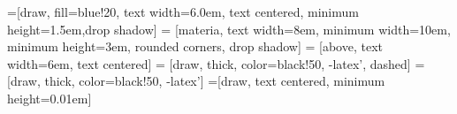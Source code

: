 \usepackage{ifthen}
\usepackage[ruled,vlined,linesnumbered]{algorithm2e}

\newcommand{\y}{\ensuremath{\boldsymbol y}}
\newcommand{\Labels}{\ensuremath{\vec{L}}}
\newcommand{\CUT}{\ensuremath{\text{CUT}}}
\newcommand{\w}{\ensuremath{w}}
\newcommand{\MC}{\ensuremath{\text{MC}}}
\newcommand{\CC}{\ensuremath{\text{CC}}}
\newcommand{\ol}[1]{\overline{#1}}
\newcommand{\ExpAndExplore}{Expand \& Explore}

\renewcommand{\vec}[1]{\mathbf{#1}}


\DeclareMathOperator*{\argmin}{\arg\!\min}


\usepackage{todonotes}

\usepackage{verbatim}
\usepackage{tikz,times}
\usetikzlibrary{shapes,arrows,chains,mindmap,backgrounds,positioning,calc}


\usepackage{amsmath,bm,times}
\newcommand{\mx}[1]{\mathbf{\bm{#1}}} %
\newcommand{\vc}[1]{\mathbf{\bm{#1}}} %

\usepackage{geometry}


\usetikzlibrary{shadows,arrows}

=[draw, fill=blue!20, text width=6.0em, text centered,
  minimum height=1.5em,drop shadow]
 = [materia, text width=8em, minimum width=10em,
  minimum height=3em, rounded corners, drop shadow]
 = [above, text width=6em, text centered]
 = [draw, thick, color=black!50, -latex', dashed]
 = [draw, thick, color=black!50, -latex']
=[draw, text centered, minimum height=0.01em]
 
\newcommand{\blockdist}{1.3}
\newcommand{\edgedist}{1.5}

\newcommand{\practica}[2]{node (p#1) [practica]
  {Pr\'actica #1\\{\scriptsize\textit{#2}}}}

\newcommand{\background}[5]{%
  \begin{pgfonlayer}{background}
    \path (#1.west |- #2.north)+(-0.5,0.5) node (a1) {};
    \path (#3.east |- #4.south)+(+0.5,-0.25) node (a2) {};
    \path[fill=yellow!20,rounded corners, draw=black!50, dashed]
      (a1) rectangle (a2);
    \path (a1.east |- a1.south)+(0.8,-0.3) node (u1)[texto]
      {\scriptsize\textit{Unidad #5}};
  \end{pgfonlayer}}

